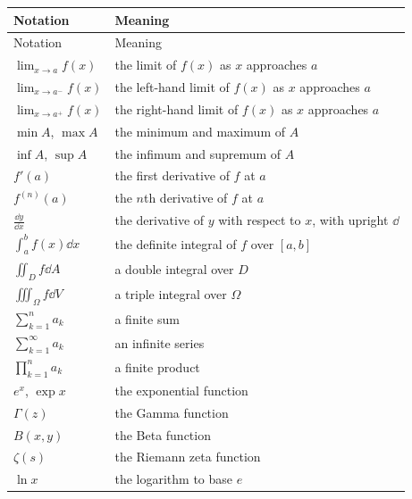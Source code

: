     {\small
    \renewcommand{\arraystretch}{1.18}
    \begin{longtable}{@{}L{0.27\textwidth}L{0.65\textwidth}@{}}
        \toprule
        Notation & Meaning \\
        \midrule
        \endfirsthead

        \toprule
        Notation & Meaning \\
        \midrule
        \endhead

        \bottomrule
        \endlastfoot

        $\displaystyle\lim_{x\to a}f(x)$ & the limit of $f(x)$ as $x$ approaches $a$ \\
        $\displaystyle\lim_{x\to a^-}f(x)$ & the left-hand limit of $f(x)$ as $x$ approaches $a$ \\
        $\displaystyle\lim_{x\to a^+}f(x)$ & the right-hand limit of $f(x)$ as $x$ approaches $a$ \\
        $\min A$, $\max A$ & the minimum and maximum of $A$ \\
        $\inf A$, $\sup A$ & the infimum and supremum of $A$ \\
        $f'(a)$ & the first derivative of $f$ at $a$ \\
        $f^{(n)}(a)$ & the $n$th derivative of $f$ at $a$ \\
        $\displaystyle\frac{\dd y}{\dd x}$ & the derivative of $y$ with respect to $x$, with upright $\dd$ \\
        $\displaystyle\int_a^b f(x)\dd x$ & the definite integral of $f$ over $[a,b]$ \\
        $\displaystyle\iint_D f\dd A$ & a double integral over $D$ \\
        $\displaystyle\iiint_\Omega f\dd V$ & a triple integral over $\Omega$ \\
        $\displaystyle\sum_{k=1}^{n}a_k$ & a finite sum \\
        $\displaystyle\sum_{k=1}^{\infty}a_k$ & an infinite series \\
        $\displaystyle\prod_{k=1}^{n}a_k$ & a finite product \\
        $e^x$, $\exp x$ & the exponential function \\
        $\Gamma(z)$ & the Gamma function \\
        $B(x,y)$ & the Beta function \\
        $\zeta(s)$ & the Riemann zeta function \\
        $\ln x$ & the logarithm to base $e$ \\

\end{longtable}}
